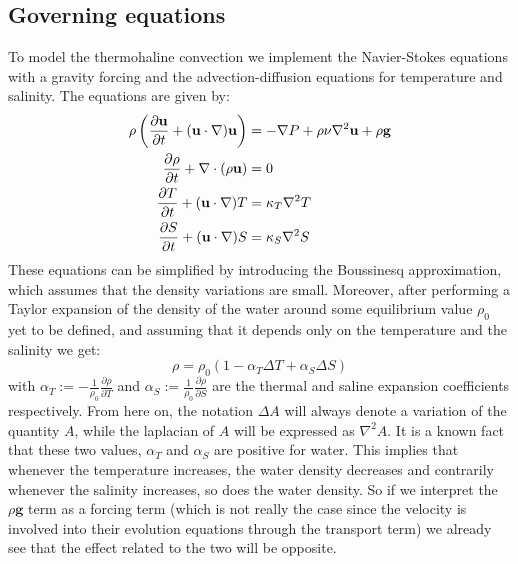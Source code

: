 \documentclass{article}
\begin{document}
\subsection{Governing equations}
To model the thermohaline convection we implement the Navier-Stokes equations with a gravity forcing and the advection-diffusion equations for temperature and salinity. The equations are given by:
\begin{equation}
  \begin{aligned}
    \rho\left(\frac{\partial\mathbf{u}}{\partial t} + (\mathbf{u}\cdot\nabla)\mathbf{u}\right) & = -\nabla P + \rho\nu\nabla^2\mathbf{u} + \rho \mathbf{g} \\
    \pdv{\rho}{t} + \nabla\cdot(\rho\mathbf{u})                                                & = 0                                                       \\
    \frac{\partial T}{\partial t} + (\mathbf{u}\cdot\nabla)T                                   & = \kappa_T \nabla^2T                                      \\
    \frac{\partial S}{\partial t} + (\mathbf{u}\cdot\nabla)S                                   & = \kappa_S \nabla^2S                                      \\
  \end{aligned}
\end{equation}
These equations can be simplified by introducing the Boussinesq approximation, which assumes that the density variations are small. Moreover, after performing a Taylor expansion of the density of the water around some equilibrium value $\rho_0$ yet to be defined, and assuming that it depends only on the temperature and the salinity we get:
\begin{equation}
  \rho = \rho_0(1-\alpha_T\Delta T + \alpha_S\Delta S)
\end{equation}
with $\alpha_T:= -\frac{1}{\rho_0}\frac{\partial\rho}{\partial T}$ and $\alpha_S:= \frac{1}{\rho_0}\frac{\partial\rho}{\partial S}$ are the thermal and saline expansion coefficients respectively. From here on, the notation $\Delta A$ will always denote a variation of the quantity $A$, while the laplacian of $A$ will be expressed as $\nabla^2A$. It is a known fact that these two values, $\alpha_T$ and $\alpha_S$ are positive for water. This implies that whenever the temperature increases, the water density decreases and contrarily whenever the salinity increases, so does the water density. So if we interpret the $\rho\mathbf{g}$ term as a forcing term (which is not really the case since the velocity is involved into their evolution equations through the transport term) we already see that the effect related to the two will be opposite.
\end{document}
